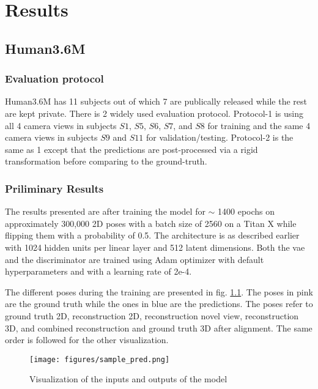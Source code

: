 \chapter{Results} %
\label{chap:results}
\section{Human3.6M}
\subsection{Evaluation protocol}
Human3.6M has 11 subjects out of which 7 are publically released while the rest are kept private. There is 2 widely used evaluation protocol. Protocol-1 is using all 4 camera views in subjects $S1$, $S5$, $S6$, $S7$, and $S8$ for training and the same 4 camera views in subjects $S9$ and $S11$ for validation/testing. Protocol-2 is the same as 1 except that the predictions are post-processed via a rigid transformation
before comparing to the ground-truth.


\subsection{Priliminary Results}

The results presented are after training the model for $\sim$ 1400 epochs on approximately 300,000 2D poses with a batch size of 2560 on a Titan X while flipping them with a probability of 0.5. The architecture is as described earlier with 1024 hidden units per linear layer and 512 latent dimensions. Both the \ac{vae} and the discriminator are trained using Adam optimizer with default hyperparameters and with a learning rate of 2e-4. 

The different poses during the training are presented in fig. \ref{fig:sample_pred}. The poses in pink are the ground truth while the ones in blue are the predictions. The poses refer to ground truth 2D, reconstruction 2D, reconstruction novel view, reconstruction 3D, and combined reconstruction and ground truth 3D after alignment. The same order is followed for the other visualization. 

\begin{figure}[!h]
    \centering
    \texttt{[image: figures/sample\_pred.png]}
    \caption{Visualization of the inputs and outputs of the model}
    \label{fig:sample_pred}
\end{figure}

